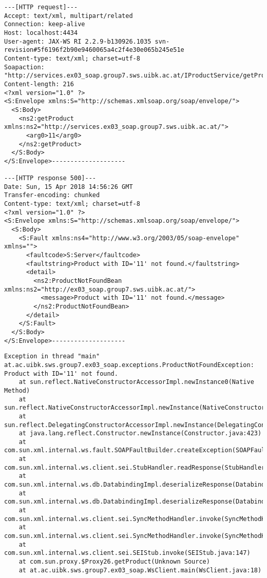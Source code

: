 \documentclass[a4paper]{article}
\begin{document}
\begin{lstlisting}[caption=Request \& Response for SOAP Fault in \emph{getProduct()}]
---[HTTP request]---
Accept: text/xml, multipart/related
Connection: keep-alive
Host: localhost:4434
User-agent: JAX-WS RI 2.2.9-b130926.1035 svn-revision#5f6196f2b90e9460065a4c2f4e30e065b245e51e
Content-type: text/xml; charset=utf-8
Soapaction: "http://services.ex03_soap.group7.sws.uibk.ac.at/IProductService/getProductRequest"
Content-length: 216
<?xml version="1.0" ?>
<S:Envelope xmlns:S="http://schemas.xmlsoap.org/soap/envelope/">
  <S:Body>
    <ns2:getProduct xmlns:ns2="http://services.ex03_soap.group7.sws.uibk.ac.at/">
      <arg0>11</arg0>
    </ns2:getProduct>
  </S:Body>
</S:Envelope>--------------------

---[HTTP response 500]---
Date: Sun, 15 Apr 2018 14:56:26 GMT
Transfer-encoding: chunked
Content-type: text/xml; charset=utf-8
<?xml version="1.0" ?>
<S:Envelope xmlns:S="http://schemas.xmlsoap.org/soap/envelope/">
  <S:Body>
    <S:Fault xmlns:ns4="http://www.w3.org/2003/05/soap-envelope" xmlns="">
      <faultcode>S:Server</faultcode>
      <faultstring>Product with ID='11' not found.</faultstring>
      <detail>
        <ns2:ProductNotFoundBean xmlns:ns2="http://ex03_soap.group7.sws.uibk.ac.at/">
          <message>Product with ID='11' not found.</message>
        </ns2:ProductNotFoundBean>
      </detail>
    </S:Fault>
  </S:Body>
</S:Envelope>--------------------
\end{lstlisting}

\begin{lstlisting}[caption=SOAP Fault as user-defined \emph{ProductNotFoundException}]
Exception in thread "main" at.ac.uibk.sws.group7.ex03_soap.exceptions.ProductNotFoundException: Product with ID='11' not found.
	at sun.reflect.NativeConstructorAccessorImpl.newInstance0(Native Method)
	at sun.reflect.NativeConstructorAccessorImpl.newInstance(NativeConstructorAccessorImpl.java:62)
	at sun.reflect.DelegatingConstructorAccessorImpl.newInstance(DelegatingConstructorAccessorImpl.java:45)
	at java.lang.reflect.Constructor.newInstance(Constructor.java:423)
	at com.sun.xml.internal.ws.fault.SOAPFaultBuilder.createException(SOAPFaultBuilder.java:135)
	at com.sun.xml.internal.ws.client.sei.StubHandler.readResponse(StubHandler.java:238)
	at com.sun.xml.internal.ws.db.DatabindingImpl.deserializeResponse(DatabindingImpl.java:189)
	at com.sun.xml.internal.ws.db.DatabindingImpl.deserializeResponse(DatabindingImpl.java:276)
	at com.sun.xml.internal.ws.client.sei.SyncMethodHandler.invoke(SyncMethodHandler.java:104)
	at com.sun.xml.internal.ws.client.sei.SyncMethodHandler.invoke(SyncMethodHandler.java:77)
	at com.sun.xml.internal.ws.client.sei.SEIStub.invoke(SEIStub.java:147)
	at com.sun.proxy.$Proxy26.getProduct(Unknown Source)
	at at.ac.uibk.sws.group7.ex03_soap.WsClient.main(WsClient.java:18)
\end{lstlisting}
\end{document}
